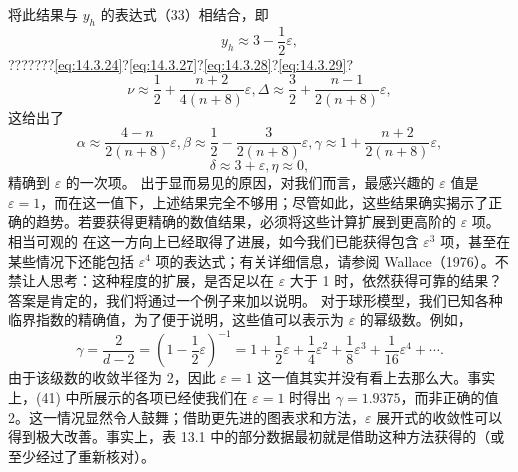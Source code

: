 将此结果与 \(y_h\) 的表达式（33）相结合，即
\begin{equation}\tag{14.4.39}\label{eq:14.4.39}
y _ { h } \approx 3 - \frac { 1 } { 2 } \varepsilon ,
\end{equation}
???????\autoref{eq:14.3.24}?\autoref{eq:14.3.27}?\autoref{eq:14.3.28}?\autoref{eq:14.3.29}?
\begin{equation}\tag{14.4.40}\label{eq:14.4.40}
\nu \approx \frac { 1 } { 2 } + \frac { n + 2 } { 4 ( n + 8 ) } \varepsilon ,  \Delta \approx \frac { 3 } { 2 } + \frac { n - 1 } { 2 ( n + 8 ) } \varepsilon ,
\end{equation}
这给出了
\begin{equation}\tag{14.4.41}\label{eq:14.4.41}
\alpha \approx \frac { 4 - n } { 2 ( n + 8 ) } \varepsilon ,  \beta \approx \frac { 1 } { 2 } - \frac { 3 } { 2 ( n + 8 ) } \varepsilon ,  \gamma \approx 1 + \frac { n + 2 } { 2 ( n + 8 ) } \varepsilon ,
\end{equation}
\begin{equation}\tag{14.4.42}\label{eq:14.4.42}
\delta \approx 3 + \varepsilon ,  \eta \approx 0 ,
\end{equation}
精确到 \(\varepsilon\) 的一次项。
出于显而易见的原因，对我们而言，最感兴趣的 \(\varepsilon\) 值是 \(\varepsilon = 1\)，而在这一值下，上述结果完全不够用；尽管如此，这些结果确实揭示了正确的趋势。若要获得更精确的数值结果，必须将这些计算扩展到更高阶的 \(\varepsilon\) 项。相当可观的
在这一方向上已经取得了进展，如今我们已能获得包含 \(\varepsilon^3\) 项，甚至在某些情况下还能包括 \(\varepsilon^4\) 项的表达式；有关详细信息，请参阅 Wallace（1976）。不禁让人思考：这种程度的扩展，是否足以在 \(\varepsilon\) 大于 1 时，依然获得可靠的结果？答案是肯定的，我们将通过一个例子来加以说明。
对于球形模型，我们已知各种临界指数的精确值，为了便于说明，这些值可以表示为 \(\varepsilon\) 的幂级数。例如，
\begin{equation}\tag{14.4.43}\label{eq:14.4.43}
\gamma = \frac { 2 } { d - 2 } = \left( 1 - \frac { 1 } { 2 } \varepsilon \right) ^{- 1} = 1 + \frac { 1 } { 2 } \varepsilon + \frac { 1 } { 4 } \varepsilon ^{2} + \frac { 1 } { 8 } \varepsilon ^{3} + \frac { 1 } { 16 } \varepsilon ^{4} + \cdots .
\end{equation}
由于该级数的收敛半径为 2，因此 \(\varepsilon = 1\) 这一值其实并没有看上去那么大。事实上，(41) 中所展示的各项已经使我们在 \(\varepsilon = 1\) 时得出 \(\gamma = 1.9375\)，而非正确的值 2。这一情况显然令人鼓舞；借助更先进的图表求和方法，\(\varepsilon\) 展开式的收敛性可以得到极大改善。事实上，表 13.1 中的部分数据最初就是借助这种方法获得的（或至少经过了重新核对）。
